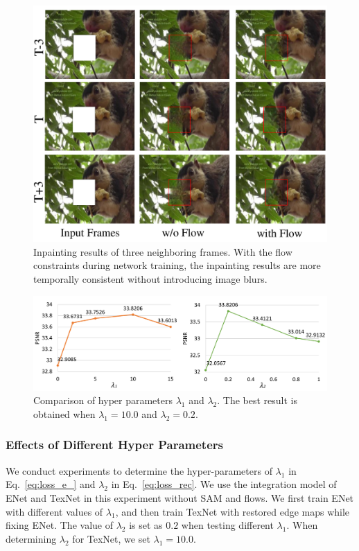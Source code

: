 \begin{figure}[t]
	\centering
	\includegraphics[width=0.9\columnwidth]{flow_vis} %
	\caption{Inpainting results of three neighboring frames. With the flow constraints during network training, the inpainting results are more temporally consistent without introducing image blurs. }
	\label{flow_vis}
\end{figure}



\begin{figure}[t]
	\centering
	\includegraphics[width=1.0\columnwidth]{lamda1} %
	\caption{Comparison of hyper parameters $\lambda_1$ and $\lambda_2$. The best result is obtained when $\lambda_1=10.0$ and $\lambda_2=0.2$.}
	\label{fig:hparam}
\end{figure}

 


\subsubsection{Effects of Different Hyper Parameters}
We conduct experiments to determine the hyper-parameters of $\lambda_1$ in Eq.~\eqref{eq:loss_e_} and $\lambda_2$ in Eq.~\eqref{eq:loss_rec}. 
We use the integration model of ENet and TexNet in this experiment without SAM and flows.
We first train ENet with different values of $\lambda_1$, and then train TexNet with restored edge maps while fixing ENet. The value of $\lambda_2$ is set as $0.2$ when testing different $\lambda_1$.
When determining $\lambda_2$ for TexNet, we set $\lambda_1=10.0$.

